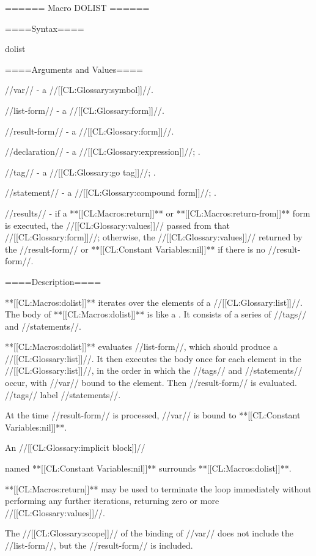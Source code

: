 ====== Macro DOLIST ======

====Syntax====

\DefmacWithValuesNewline dolist {  } {}

====Arguments and Values====

//var// - a //[[CL:Glossary:symbol]]//.

//list-form// - a //[[CL:Glossary:form]]//.

//result-form// - a //[[CL:Glossary:form]]//.

//declaration// - a  //[[CL:Glossary:expression]]//; \noeval.

//tag// - a //[[CL:Glossary:go tag]]//; \noeval.

//statement// - a //[[CL:Glossary:compound form]]//; \evalspecial.

//results// - if a **[[CL:Macros:return]]** or **[[CL:Macros:return-from]]** form is executed, the //[[CL:Glossary:values]]// passed from that //[[CL:Glossary:form]]//; otherwise, the //[[CL:Glossary:values]]// returned by the //result-form// or **[[CL:Constant Variables:nil]]** if there is no //result-form//.

====Description====

**[[CL:Macros:dolist]]** iterates over the elements of a //[[CL:Glossary:list]]//. The body of **[[CL:Macros:dolist]]** is like a . It consists of a series of //tags// and //statements//.

**[[CL:Macros:dolist]]** evaluates //list-form//, which should produce a //[[CL:Glossary:list]]//. It then executes the body once for each element in the //[[CL:Glossary:list]]//, in the order in which the //tags// and //statements// occur, with //var// bound to the element. Then //result-form// is evaluated. //tags// label //statements//.

At the time //result-form// is processed, //var// is bound to **[[CL:Constant Variables:nil]]**.

An //[[CL:Glossary:implicit block]]//

named **[[CL:Constant Variables:nil]]** surrounds **[[CL:Macros:dolist]]**.

**[[CL:Macros:return]]** may be used to terminate the loop immediately without performing any further iterations, returning zero or more //[[CL:Glossary:values]]//.

The //[[CL:Glossary:scope]]// of the binding of //var// does not include the //list-form//, but the //result-form// is included.

